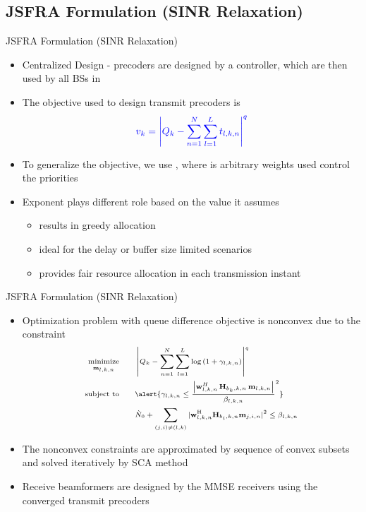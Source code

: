 \documentclass[9pt]{beamer}
\begin{document}
\subsection{\acs{JSFRA} Formulation (\acs{SINR} Relaxation)}

\begin{frame}{\acs{JSFRA} Formulation (\acs{SINR} Relaxation)}
\begin{itemize}
\item Centralized Design - precoders are designed by a controller, which are then used by all \acp{BS} in 
\item The objective used to design transmit precoders is 
\begin{equation}
\scriptsize {\color{blue} v_k = \left | Q_k - \sum_{n = 1}^N \sum_{l = 1}^{L} t_{l,k,n} \right |^q }
\end{equation}
\item To generalize the objective, we use , where  is arbitrary weights used control the priorities
\item Exponent  plays different role based on the value it assumes
	\begin{itemize}
	\item {} \alert{results in greedy allocation}
	\item {} \alert{ideal for the delay or buffer size limited scenarios}
	\item {} \alert{provides fair resource allocation in each transmission instant}
	\end{itemize}
\end{itemize}
\end{frame}

\begin{frame}{\acs{JSFRA} Formulation (\acs{SINR} Relaxation)}
\begin{itemize}
\item Optimization problem with queue difference objective is nonconvex due to the constraint
\begin{subequations}  \scriptsize
\begin{align}
\underset{\mvec{m}{l,k,n}}{\text{minimize}} & \qquad \left | Q_k - \sum_{n = 1}^N \sum_{l = 1}^{L} \log \left (1 + \gamma_{l,k,n} \right) \right |^q \\
\text{subject to} & \qquad \alert{\gamma_{l,k,n} \leq \dfrac{\left |\mvec{w}{l,k,n}^H \, \mvec{H}{b_k,k,n} \, \mvec{m}{l,k,n} \right |}{\beta_{l,k,n}}^2 } \\
& \qquad \enoise + \sum_{(j,i) \neq (l,k)} |\mvec{w}{l,k,n}^\herm \mvec{H}{b_i,k,n} \mvec{m}{j,i,n} |^2 \leq \beta_{l,k,n}
\end{align}
\end{subequations}
\item The nonconvex constraints are approximated by sequence of convex subsets and solved iteratively by \alert{\ac{SCA} method}
\item Receive beamformers are designed by the \acs{MMSE} receivers using the converged transmit precoders
\end{itemize}
\end{frame}
\end{document}
